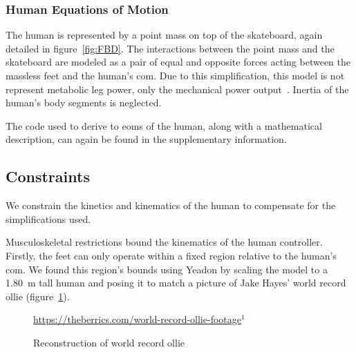 \documentclass[default,iicol]{sn-jnl}
\begin{document}
\subsubsection{Human Equations of Motion}
The human is represented by a point mass on top of the skateboard, again detailed in figure~\ref{fig:FBD}.
The interactions between the point mass and the skateboard are modeled as a pair of equal and opposite forces acting between the massless feet and the human's \gls{com}.
Due to this simplification, this model is not represent metabolic leg power, only the mechanical power output~\cite{van_der_kruk_power_2018,morin_biomechanics_2018}. Inertia of the human's body segments is neglected.

The code used to derive to \glspl{eom} of the human, along with a mathematical description, can again be found in the supplementary information.

\subsection{Constraints}

We constrain the kinetics and kinematics of the human to compensate for the simplifications used.

Musculoskeletal restrictions bound the kinematics of the human controller.
Firstly, the feet can only operate within a fixed region relative to the human's \gls{com}.
We found this region's bounds using Yeadon \cite{yeadon_simulation_1990} by scaling the model to a \SI{1.80}{\meter} tall human and posing it to match a picture of Jake Hayes' world record ollie (figure~\ref{fig:f_record}). 

\begin{figure}
    \centering
    \quad
    \caption{Reconstruction of world record ollie} 
    \label{fig:f_record}
    \centering \footnotesize \url{https://theberrics.com/world-record-ollie-footage}$^{1}$%
\end{figure}
\end{document}
